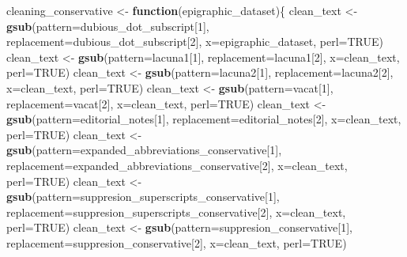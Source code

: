 \documentclass[]{article}
\newenvironment{Shaded}{\begin{snugshade}}{\end{snugshade}}
\newcommand{\ControlFlowTok}[1]{\textcolor[rgb]{0.13,0.29,0.53}{\textbf{#1}}}
\newcommand{\DataTypeTok}[1]{\textcolor[rgb]{0.13,0.29,0.53}{#1}}
\newcommand{\DecValTok}[1]{\textcolor[rgb]{0.00,0.00,0.81}{#1}}
\newcommand{\KeywordTok}[1]{\textcolor[rgb]{0.13,0.29,0.53}{\textbf{#1}}}
\newcommand{\NormalTok}[1]{#1}
\newcommand{\OtherTok}[1]{\textcolor[rgb]{0.56,0.35,0.01}{#1}}
\newcommand{\StringTok}[1]{\textcolor[rgb]{0.31,0.60,0.02}{#1}}
\begin{document}
\begin{Shaded}
\begin{Highlighting}[]
\NormalTok{cleaning_conservative <-}\StringTok{ }\ControlFlowTok{function}\NormalTok{(epigraphic_dataset)\{}
\NormalTok{  clean_text <-}\StringTok{ }\KeywordTok{gsub}\NormalTok{(}\DataTypeTok{pattern=}\NormalTok{dubious_dot_subscript[}\DecValTok{1}\NormalTok{], }\DataTypeTok{replacement=}\NormalTok{dubious_dot_subscript[}\DecValTok{2}\NormalTok{], }\DataTypeTok{x=}\NormalTok{epigraphic_dataset, }\DataTypeTok{perl=}\OtherTok{TRUE}\NormalTok{)}
\NormalTok{  clean_text <-}\StringTok{ }\KeywordTok{gsub}\NormalTok{(}\DataTypeTok{pattern=}\NormalTok{lacuna1[}\DecValTok{1}\NormalTok{], }\DataTypeTok{replacement=}\NormalTok{lacuna1[}\DecValTok{2}\NormalTok{], }\DataTypeTok{x=}\NormalTok{clean_text, }\DataTypeTok{perl=}\OtherTok{TRUE}\NormalTok{)}
\NormalTok{  clean_text <-}\StringTok{ }\KeywordTok{gsub}\NormalTok{(}\DataTypeTok{pattern=}\NormalTok{lacuna2[}\DecValTok{1}\NormalTok{], }\DataTypeTok{replacement=}\NormalTok{lacuna2[}\DecValTok{2}\NormalTok{], }\DataTypeTok{x=}\NormalTok{clean_text, }\DataTypeTok{perl=}\OtherTok{TRUE}\NormalTok{)}
\NormalTok{  clean_text <-}\StringTok{ }\KeywordTok{gsub}\NormalTok{(}\DataTypeTok{pattern=}\NormalTok{vacat[}\DecValTok{1}\NormalTok{], }\DataTypeTok{replacement=}\NormalTok{vacat[}\DecValTok{2}\NormalTok{], }\DataTypeTok{x=}\NormalTok{clean_text, }\DataTypeTok{perl=}\OtherTok{TRUE}\NormalTok{)}
\NormalTok{  clean_text <-}\StringTok{ }\KeywordTok{gsub}\NormalTok{(}\DataTypeTok{pattern=}\NormalTok{editorial_notes[}\DecValTok{1}\NormalTok{], }\DataTypeTok{replacement=}\NormalTok{editorial_notes[}\DecValTok{2}\NormalTok{], }\DataTypeTok{x=}\NormalTok{clean_text, }\DataTypeTok{perl=}\OtherTok{TRUE}\NormalTok{)}
\NormalTok{  clean_text <-}\StringTok{ }\KeywordTok{gsub}\NormalTok{(}\DataTypeTok{pattern=}\NormalTok{expanded_abbreviations_conservative[}\DecValTok{1}\NormalTok{], }\DataTypeTok{replacement=}\NormalTok{expanded_abbreviations_conservative[}\DecValTok{2}\NormalTok{], }\DataTypeTok{x=}\NormalTok{clean_text, }\DataTypeTok{perl=}\OtherTok{TRUE}\NormalTok{)}
\NormalTok{  clean_text <-}\StringTok{ }\KeywordTok{gsub}\NormalTok{(}\DataTypeTok{pattern=}\NormalTok{suppresion_superscripts_conservative[}\DecValTok{1}\NormalTok{], }\DataTypeTok{replacement=}\NormalTok{suppresion_superscripts_conservative[}\DecValTok{2}\NormalTok{], }\DataTypeTok{x=}\NormalTok{clean_text, }\DataTypeTok{perl=}\OtherTok{TRUE}\NormalTok{)}
\NormalTok{  clean_text <-}\StringTok{ }\KeywordTok{gsub}\NormalTok{(}\DataTypeTok{pattern=}\NormalTok{suppresion_conservative[}\DecValTok{1}\NormalTok{], }\DataTypeTok{replacement=}\NormalTok{suppresion_conservative[}\DecValTok{2}\NormalTok{], }\DataTypeTok{x=}\NormalTok{clean_text, }\DataTypeTok{perl=}\OtherTok{TRUE}\NormalTok{)}

\end{Highlighting}
\end{Shaded}
\end{document}
